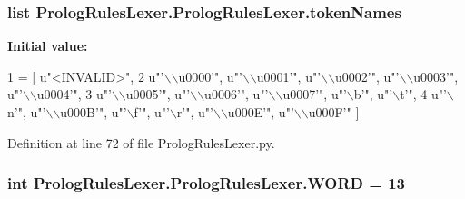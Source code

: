 \subsubsection[{token\+Names}]{\setlength{\rightskip}{0pt plus 5cm}list Prolog\+Rules\+Lexer.\+Prolog\+Rules\+Lexer.\+token\+Names\hspace{0.3cm}{\ttfamily [static]}}\label{class_prolog_rules_lexer_1_1_prolog_rules_lexer_a233edda628c3aef92186c932b2572c21}
{\bfseries Initial value\+:}
\begin{DoxyCode}
1 = [ \textcolor{stringliteral}{u"<INVALID>"},
2             \textcolor{stringliteral}{u"'\(\backslash\)\(\backslash\)u0000'"}, \textcolor{stringliteral}{u"'\(\backslash\)\(\backslash\)u0001'"}, \textcolor{stringliteral}{u"'\(\backslash\)\(\backslash\)u0002'"}, \textcolor{stringliteral}{u"'\(\backslash\)\(\backslash\)u0003'"}, \textcolor{stringliteral}{u"'\(\backslash\)\(\backslash\)u0004'"}, 
3             \textcolor{stringliteral}{u"'\(\backslash\)\(\backslash\)u0005'"}, \textcolor{stringliteral}{u"'\(\backslash\)\(\backslash\)u0006'"}, \textcolor{stringliteral}{u"'\(\backslash\)\(\backslash\)u0007'"}, \textcolor{stringliteral}{u"'\(\backslash\)b'"}, \textcolor{stringliteral}{u"'\(\backslash\)t'"}, 
4             \textcolor{stringliteral}{u"'\(\backslash\)n'"}, \textcolor{stringliteral}{u"'\(\backslash\)\(\backslash\)u000B'"}, \textcolor{stringliteral}{u"'\(\backslash\)f'"}, \textcolor{stringliteral}{u"'\(\backslash\)r'"}, \textcolor{stringliteral}{u"'\(\backslash\)\(\backslash\)u000E'"}, \textcolor{stringliteral}{u"'\(\backslash\)\(\backslash\)u000F'"} ]
\end{DoxyCode}


Definition at line 72 of file Prolog\+Rules\+Lexer.\+py.

\hypertarget{class_prolog_rules_lexer_1_1_prolog_rules_lexer_a32b617c2545824c32efc85efcbe06555}{}
\subsubsection[{W\+O\+R\+D}]{\setlength{\rightskip}{0pt plus 5cm}int Prolog\+Rules\+Lexer.\+Prolog\+Rules\+Lexer.\+W\+O\+R\+D = 13\hspace{0.3cm}{\ttfamily [static]}}\label{class_prolog_rules_lexer_1_1_prolog_rules_lexer_a32b617c2545824c32efc85efcbe06555}


